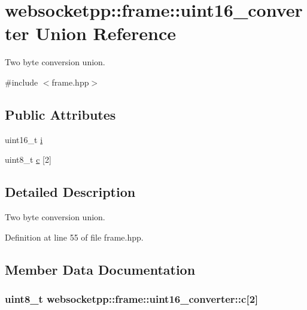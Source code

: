 \hypertarget{unionwebsocketpp_1_1frame_1_1uint16__converter}{}\section{websocketpp\+:\+:frame\+:\+:uint16\+\_\+converter Union Reference}
\label{unionwebsocketpp_1_1frame_1_1uint16__converter}


Two byte conversion union.  




{\ttfamily \#include $<$frame.\+hpp$>$}

\subsection*{Public Attributes}
\begin{DoxyCompactItemize}
\item 
uint16\+\_\+t \hyperlink{unionwebsocketpp_1_1frame_1_1uint16__converter_af60efc5747260bafeb6cd2b8ab267e2d}{i}
\item 
uint8\+\_\+t \hyperlink{unionwebsocketpp_1_1frame_1_1uint16__converter_acac6733730c538163e39f4fed359168a}{c} \mbox{[}2\mbox{]}
\end{DoxyCompactItemize}


\subsection{Detailed Description}
Two byte conversion union. 

Definition at line 55 of file frame.\+hpp.



\subsection{Member Data Documentation}
\hypertarget{unionwebsocketpp_1_1frame_1_1uint16__converter_acac6733730c538163e39f4fed359168a}{}
\subsubsection[{c}]{\setlength{\rightskip}{0pt plus 5cm}uint8\+\_\+t websocketpp\+::frame\+::uint16\+\_\+converter\+::c\mbox{[}2\mbox{]}}\label{unionwebsocketpp_1_1frame_1_1uint16__converter_acac6733730c538163e39f4fed359168a}


